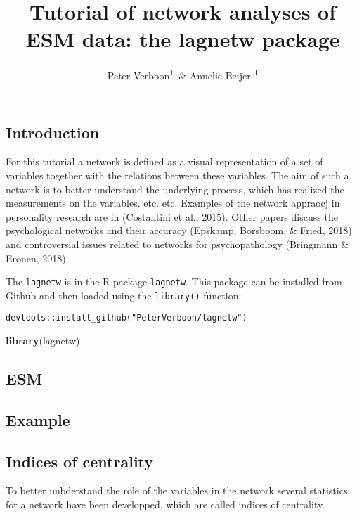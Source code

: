 \documentclass[man,floatsintext]{apa6}
\title{Tutorial of network analyses of ESM data: the lagnetw package}
\author{Peter Verboon\textsuperscript{1}~\& Annelie Beijer \textsuperscript{1 }}
\date{}
\affiliation{
\vspace{0.5cm}
\textsuperscript{1} Open University}
\newenvironment{Shaded}{\begin{snugshade}}{\end{snugshade}}
\newcommand{\KeywordTok}[1]{\textcolor[rgb]{0.13,0.29,0.53}{\textbf{#1}}}
\newcommand{\NormalTok}[1]{#1}
\begin{document}
\maketitle

\subsection{Introduction}\label{introduction}

For this tutorial a network is defined as a visual representation of a
set of variables together with the relations between these variables.
The aim of such a network is to better understand the underlying
process, which has realized the measurements on the variables. etc. etc.
Examples of the network appraocj in personality research are in
(Costantini et al., 2015). Other papers discuss the psychological
networks and their accuracy (Epskamp, Borsboom, \& Fried, 2018) and
controversial issues related to networks for psychopathology (Bringmann
\& Eronen, 2018).

The \texttt{lagnetw} is in the R package \texttt{lagnetw}. This package
can be installed from Github and then loaded using the
\texttt{library()} function:

\texttt{devtools::install\_github("PeterVerboon/lagnetw")}

\begin{Shaded}
\begin{Highlighting}[]
\KeywordTok{library}\NormalTok{(lagnetw)}
\end{Highlighting}
\end{Shaded}

\subsection{ESM}\label{esm}

\subsection{Example}\label{example}

\subsection{Indices of centrality}\label{indices-of-centrality}

To better unbderstand the role of the variables in the network several
statistics for a network have been developped, which are called indices
of centrality.
\end{document}
